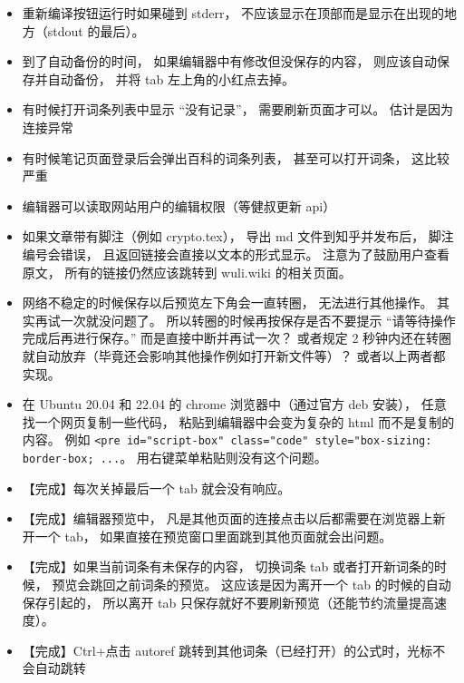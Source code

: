 \begin{itemize}
\item 重新编译按钮运行时如果碰到 stderr， 不应该显示在顶部而是显示在出现的地方（stdout 的最后）。

\item 到了自动备份的时间， 如果编辑器中有修改但没保存的内容， 则应该自动保存并自动备份， 并将 tab 左上角的小红点去掉。

\item 有时候打开词条列表中显示 “没有记录”， 需要刷新页面才可以。 估计是因为连接异常

\item 有时候笔记页面登录后会弹出百科的词条列表， 甚至可以打开词条， 这比较严重

\item 编辑器可以读取网站用户的编辑权限（等健叔更新 api）

\item 如果文章带有脚注（例如 crypto.tex）， 导出 md 文件到知乎并发布后， 脚注编号会错误， 且返回链接会直接以文本的形式显示。 注意为了鼓励用户查看原文， 所有的链接仍然应该跳转到 wuli.wiki 的相关页面。

\item 网络不稳定的时候保存以后预览左下角会一直转圈， 无法进行其他操作。 其实再试一次就没问题了。 所以转圈的时候再按保存是否不要提示 “请等待操作完成后再进行保存。” 而是直接中断并再试一次？ 或者规定 2 秒钟内还在转圈就自动放弃（毕竟还会影响其他操作例如打开新文件等）？ 或者以上两者都实现。

\item 在 Ubuntu 20.04 和 22.04 的 chrome 浏览器中（通过官方 deb 安装）， 任意找一个网页复制一些代码， 粘贴到编辑器中会变为复杂的 html 而不是复制的内容。 例如 \verb|<pre id="script-box" class="code" style="box-sizing: border-box; ...|。 用右键菜单粘贴则没有这个问题。

\item 【完成】每次关掉最后一个 tab 就会没有响应。

\item 【完成】编辑器预览中， 凡是其他页面的连接点击以后都需要在浏览器上新开一个 tab， 如果直接在预览窗口里面跳到其他页面就会出问题。

\item 【完成】如果当前词条有未保存的内容， 切换词条 tab 或者打开新词条的时候， 预览会跳回之前词条的预览。 这应该是因为离开一个 tab 的时候的自动保存引起的， 所以离开 tab 只保存就好不要刷新预览（还能节约流量提高速度）。

\item 【完成】Ctrl+点击 autoref 跳转到其他词条（已经打开）的公式时，光标不会自动跳转


\end{itemize}
